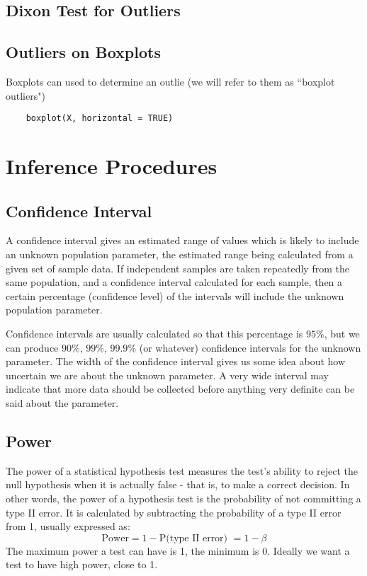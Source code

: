 \subsection{Dixon Test for Outliers}
\subsection{Outliers on Boxplots}
Boxplots can used to determine an outlie (we will refer to them as ``boxplot outliers")
\begin{framed}
	\begin{verbatim}
	boxplot(X, horizontal = TRUE)
	\end{verbatim}
\end{framed}

\newpage

\section{Inference Procedures}
\subsection{Confidence Interval }
A confidence interval gives an estimated range of values which is likely to include an unknown population parameter, the estimated range being calculated from a given set of sample data. If independent samples are taken repeatedly from the same population, and a confidence interval calculated for each sample, then a certain percentage (confidence level) of the intervals will include the unknown population parameter. 

Confidence intervals are usually calculated so that this percentage is $95\%$, but we can produce $90\%$, $99\%$, $99.9\%$ (or whatever) confidence intervals for the unknown parameter. The width of the confidence interval gives us some idea about how uncertain we are about the unknown parameter. A very wide interval may indicate that more data should be collected before anything very definite can be said about the parameter.
\subsection{Power }
The power of a statistical hypothesis test measures the test's ability to reject the null hypothesis when it is actually false - that is, to make a correct decision. In other words, the power of a hypothesis test is the probability of not committing a type II error. It is calculated by subtracting the probability of a type II error from 1, usually expressed as: 
\[\mbox{Power} = 1 - \mbox{P(type II error) } = 1- \beta \]The maximum power a test can have is 1, the minimum is 0. Ideally we want a test to have high power, close to 1.


